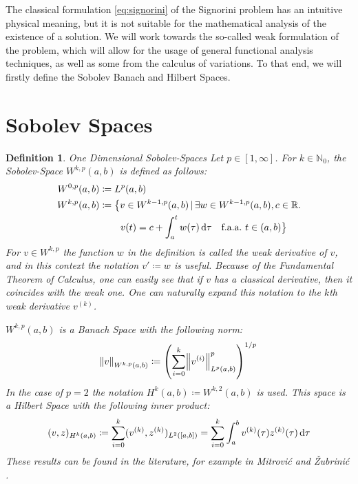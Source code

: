 \documentclass[headsepline,footsepline,footinclude=false,oneside,fontsize=11pt,paper=a4,listof=totoc,bibliography=totoc]{scrbook} %
\newtheorem{definition}{Definition}
\begin{document}
The classical formulation \eqref{eq:signorini} of the Signorini problem has an intuitive physical meaning, but it is not suitable for the mathematical analysis of the existence of a solution. We will work towards the so-called weak formulation of the problem, which will allow for the usage of general functional analysis techniques, as well as some from the calculus of variations. To that end, we will firstly define the Sobolev Banach and Hilbert Spaces.

\section{Sobolev Spaces}
\begin{definition}One Dimensional Sobolev-Spaces \newline
	Let $p\in [1,\infty]$. For $k \in \mathbb{N}_0$, the Sobolev-Space $W^{k,p}(a,b)$ is defined as follows:
	\begin{align}
	\begin{split}
	W^{0,p}(a,b) &\coloneqq L^p(a,b) \\
	W^{k,p}(a,b) &\coloneqq \big\{ v \in W^{k-1,p}(a,b) \,|\, \exists w \in W^{k-1,p}(a,b), c\in\mathbb{R}. \\
	& \phantom{\coloneqq \big\{\,\,} v(t) =  c + \int_a^t w(\tau) \dif \tau \quad \text{f.a.a.} \,\, t\in (a,b)  \big\}
	\end{split}
	\end{align}
	For $v\in W^{k,p}$ the function $w$ in the definition is called the weak derivative of $v$, and in this context the notation $v' \coloneqq w$ is useful. Because of the Fundamental Theorem of Calculus, one can easily see that if $v$ has a classical derivative, then it coincides with the weak one. One can naturally expand this notation to the $k$th weak derivative $v^{(k)}$.
	
	$W^{k,p}(a,b)$ is a Banach Space with the following norm:
	\begin{equation}
	\norm{v}_{W^{k,p}(a,b)} \coloneqq \left(\sum\limits_{i = 0}^k \norm{v^{(i)}}_{L^p(a,b)}^p\right)^{1/p} \label{eq:sobolev1_norm}
	\end{equation}
	In the case of $p=2$ the notation $H^k(a,b) \coloneqq W^{k,2}(a,b)$ is used. This space is a Hilbert Space with the following inner product:
	\begin{equation}
	(v,z)_{H^k(a,b)} \coloneqq \sum_{i=0}^{k} (v^{(k)}, z^{(k)})_{L^2([a,b])} = \sum_{i=0}^{k} \int_a^b v^{(k)}(\tau)z^{(k)}(\tau) \dif \tau \label{eq:sobolev1_inner_product}
	\end{equation}
	These results can be found in the literature, for example in Mitrović and Žubrinić \cite[Chapter 5, Section 2, Remark 2]{mitrovic1997fundamentals}.
\end{definition}
\end{document}
